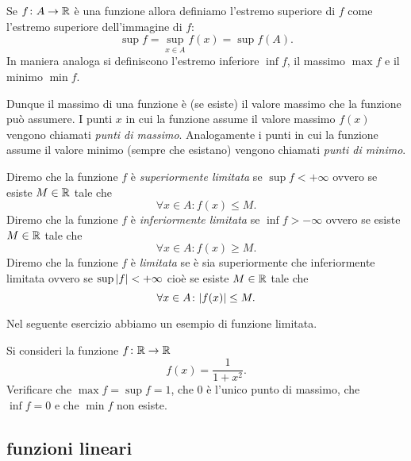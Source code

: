 \begin{definition}
\label{def:funzione_limitata}%
Se $f\colon A \to {\mathbb R}$ è una funzione allora definiamo
l'estremo superiore di $f$ come l'estremo superiore
dell'immagine di $f$:
\[
  \sup f = \sup_{x\in A} f(x) = \sup f(A).
\]
In maniera analoga si definiscono l'estremo inferiore $\inf f$,
il massimo $\max f$ e il minimo $\min f$.

Dunque il massimo di una funzione è (se esiste) il valore massimo
che la funzione può assumere. I punti $x$ in cui
la funzione assume il valore massimo $f(x)$ vengono chiamati
\emph{punti di massimo}.
%
%
%
%
Analogamente i punti in cui la funzione
assume il valore minimo (sempre che esistano) vengono
chiamati \emph{punti di minimo}.

Diremo che la funzione $f$ è
\emph{superiormente limitata}%
%
se $\sup f<+\infty$
ovvero se esiste $M\in {\mathbb R}$ tale che
\[
\forall x\in A \colon f(x) \le M.
\]
Diremo che la funzione $f$ è
\emph{inferiormente limitata}%
%
se $\inf f > -\infty$ ovvero se esiste $M\in {\mathbb R}$ tale che
\[
 \forall x \in A \colon f(x) \ge M.
\]
Diremo che la funzione $f$ è \emph{limitata}%
%
se è sia superiormente che inferiormente limitata ovvero
se $\sup{\left|f\right|}<+\infty$ cioè se esiste $M\in {\mathbb R}$ tale che
\[
\forall x \in A \colon {\left|f(x)\right|}\le M.
\]
\end{definition}

Nel seguente esercizio abbiamo un esempio di funzione limitata.
\begin{exercise}
Si consideri la funzione $f\colon {\mathbb R}\to{\mathbb R}$
\[
 f(x) = \frac{1}{1+x^2}.
\]
Verificare che $\max f = \sup f = 1$, che $0$ è l'unico punto di massimo,
che $\inf f = 0$ e che $\min f$ non esiste.
\end{exercise}

\subsection{funzioni lineari}

